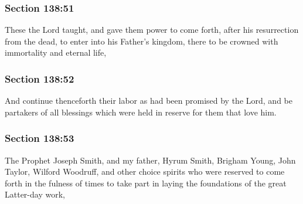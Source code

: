 	\subsubsection{Section 138:51} %
		\label{DC138-51}

		These the Lord taught, and gave them power to come forth, after his resurrection from the dead, to enter into his Father's kingdom, there to be crowned with immortality and eternal life,


	\subsubsection{Section 138:52} %
		\label{DC138-52}

		And continue thenceforth their labor as had been promised by the Lord, and be partakers of all blessings which were held in reserve for them that love him.


	\subsubsection{Section 138:53} %
		\label{DC138-53}

		The Prophet Joseph Smith, and my father, Hyrum Smith, Brigham Young, John Taylor, Wilford Woodruff, and other choice spirits who were reserved to come forth in the fulness of times to take part in laying the foundations of the great Latter-day work,


